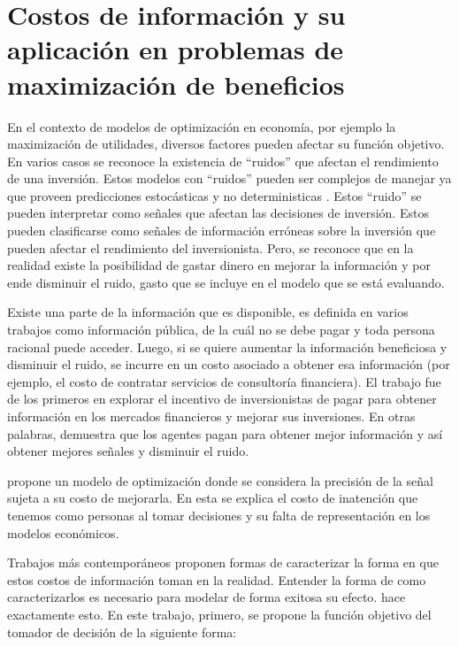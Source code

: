 \section{Costos de información y su aplicación en problemas de maximización de beneficios}\label{marco:costos}

En el contexto de modelos de optimización en economía, por ejemplo la maximización de utilidades, diversos factores pueden afectar su función objetivo. En varios casos se reconoce la existencia de ``ruidos'' que afectan el rendimiento de una inversión. Estos modelos con ``ruidos'' pueden ser complejos de manejar ya que proveen predicciones estocásticas y no deterministicas . Estos ``ruido'' se pueden interpretar como señales que afectan las decisiones de inversión. Estos pueden clasificarse como señales de información erróneas sobre la inversión que pueden afectar el rendimiento del inversionista. Pero, se reconoce que en la realidad existe la posibilidad de gastar dinero en mejorar la información y por ende disminuir el ruido, gasto que se incluye en el modelo que se está evaluando.
\vspace{2.5mm}

Existe una parte de la información que es disponible, es definida en varios trabajos como información pública, de la cuál no se debe pagar y toda persona racional puede acceder. Luego, si se quiere aumentar la información beneficiosa y disminuir el ruido, se incurre en un costo asociado a obtener esa información (por ejemplo, el costo de contratar servicios de consultoría financiera). El trabajo  fue de los primeros en explorar el incentivo de inversionistas de pagar para obtener información en los mercados financieros y mejorar sus inversiones. En otras palabras, demuestra que los agentes pagan para obtener mejor información y así obtener mejores señales y disminuir el ruido. 
\vspace{2.5mm}

 propone un modelo de optimización donde se considera la precisión de la señal sujeta a su costo de mejorarla. En esta se explica el costo de inatención que tenemos como personas al tomar decisiones y su falta de representación en los modelos económicos.
\vspace{2.5mm}

Trabajos más contemporáneos proponen formas de caracterizar la forma en que estos costos de información toman en la realidad. Entender la forma de como caracterizarlos es necesario para modelar de forma exitosa su efecto.  hace exactamente esto. En este trabajo, primero, se propone la función objetivo del tomador de decisión de la siguiente forma: 

